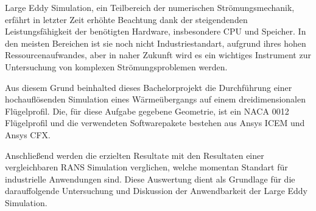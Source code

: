 Large Eddy Simulation, ein Teilbereich der numerischen Strömungsmechanik, erfährt in letzter Zeit erhöhte Beachtung dank der steigendenden Leistungsfähigkeit der ben\"otigten Hardware, insbesondere CPU und Speicher. In den meisten Bereichen ist sie noch nicht Industriestandart, aufgrund ihres hohen Ressourcenaufwandes, aber in naher Zukunft wird es ein wichtiges Instrument zur Untersuchung von komplexen Str\"omungsproblemen werden.

Aus diesem Grund beinhalted dieses Bachelorprojekt die Durchf\"uhrung einer hochauflösenden Simulation eines W\"arme\"ubergangs auf einem dreidimensionalen Fl\"ugelprofil. Die, für diese Aufgabe gegebene Geometrie, ist ein NACA 0012 Fl\"ugelprofil und die verwendeten Softwarepakete bestehen aus Ansys ICEM und Ansys CFX. 

Anschließend werden die erzielten Resultate mit den Resultaten einer vergleichbaren RANS Simulation verglichen, welche momentan Standart für industrielle Anwendungen sind. Diese Auswertung dient als Grundlage für die darauffolgende Untersuchung und Diskussion der Anwendbarkeit der Large Eddy Simulation.